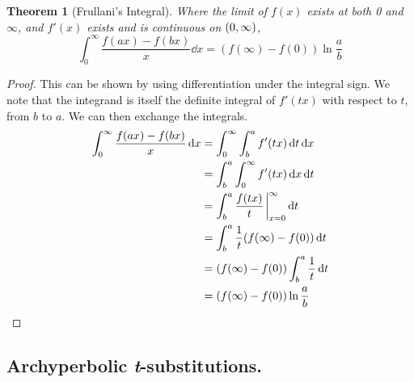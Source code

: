 \documentclass[fleqn,a4paper,11pt]{article}
\newtheorem{theorem}{Theorem}[section]
\begin{document}
    \begin{theorem}[Frullani's Integral]
    Where the limit of \(f(x)\) exists at both 0 and \(\infty\), and \(f'(x)\)
    exists and is continuous on \(\intoo{0, \infty}\),
    \begin{equation*}
    \int_0^\infty \frac{f(ax) - f(bx)} x \dd{x}
        = (f(\infty) - f(0))\ln \frac ab
    \end{equation*}
    \end{theorem}
    \begin{proof}
    This can be shown by using differentiation under the integral sign. We note
    that the integrand is itself the definite integral of \(f'(tx)\) with
    respect to \(t\), from \(b\) to \(a\). We can then exchange the integrals.
    \begin{align*}
    \int_0^\infty \frac{f(ax) - f(bx)} x \dd{x} &=
        \int_0^\infty \int_b^a f'(tx) \dd{t} \dd{x} \\
        &= \int_b^a \int_0^\infty f'(tx) \dd{x} \dd{t} \\
        &= \int_b^a \frac{f(tx)}{t}\eval_{x=0}^\infty \dd{t} \\
        &= \int_b^a \frac 1t(f(\infty) - f(0)) \dd{t} \\
        &= (f(\infty) - f(0))\int_b^a \frac 1t \dd{t} \\
        &= (f(\infty) - f(0))\ln \frac ab \qedhere
    \end{align*}
    \end{proof}

    \subsection{Archyperbolic \textit t-substitutions.}
\end{document}
